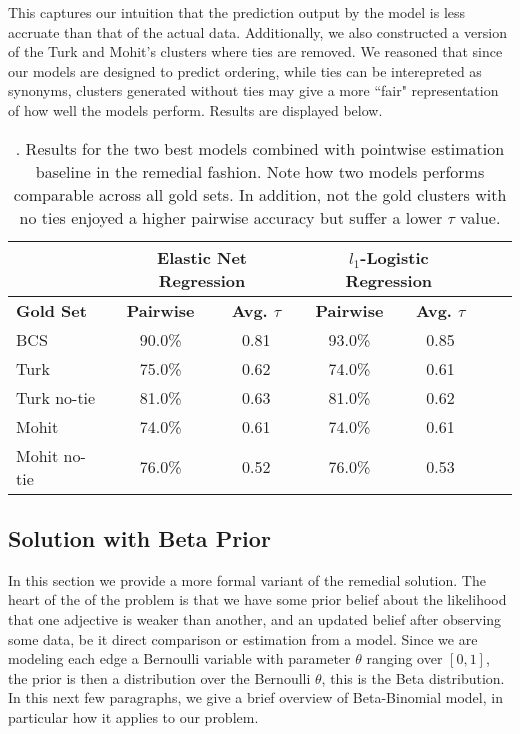 This captures our intuition that the prediction output by the model is less accruate than that of the actual data. Additionally, we also constructed a version of the Turk and Mohit's clusters where ties are removed. We reasoned that since our models are designed to predict ordering, while ties can be interepreted as synonyms, clusters generated without ties may give a more ``fair" representation of how well the models perform. Results are displayed below. 

\begin{table}
\small
\centering
\begin{tabular}{|l|cc|cc|cc|}
	\hline 
	& \multicolumn{2}{c|}{Elastic Net Regression } 
	& \multicolumn{2}{c|}{$l_1$-Logistic Regression} \\
	\hline 
	\bf Gold Set
	& \bf Pairwise & \bf Avg. $\tau$  
	& \bf Pairwise & \bf Avg. $\tau$  \\ 
	\hline
	BCS          & 90.0\% & 0.81 & 93.0\%  &  0.85 \\
	Turk         & 75.0\% & 0.62 & 74.0\%  &  0.61 \\
	Turk no-tie  & 81.0\% & 0.63 & 81.0\%  &  0.62 \\
	Mohit        & 74.0\% & 0.61 & 74.0\%  &  0.61 \\
	Mohit no-tie & 76.0\% & 0.52 & 76.0\%  &  0.53 \\
	\hline
\end{tabular}
\caption{\label{font-table}. Results for the two best models combined with pointwise estimation baseline in the remedial fashion. Note how two models performs comparable across all gold sets. In addition, not the gold clusters with no ties enjoyed a higher pairwise accuracy but suffer a lower $\tau$ value.}
\end{table}

\subsection{Solution with Beta Prior}

In this section we provide a more formal variant of the remedial solution. The heart of the of the problem is that we have some prior belief about the likelihood that one adjective is weaker than another, and an updated belief after observing some data, be it direct comparison or estimation from a model. Since we are modeling each edge a Bernoulli variable with parameter $\theta$ ranging over $[0,1]$, the prior is then a distribution over the Bernoulli $\theta$, this is the Beta distribution. In this next few paragraphs, we give a brief overview of Beta-Binomial model, in particular how it applies to our problem. 

